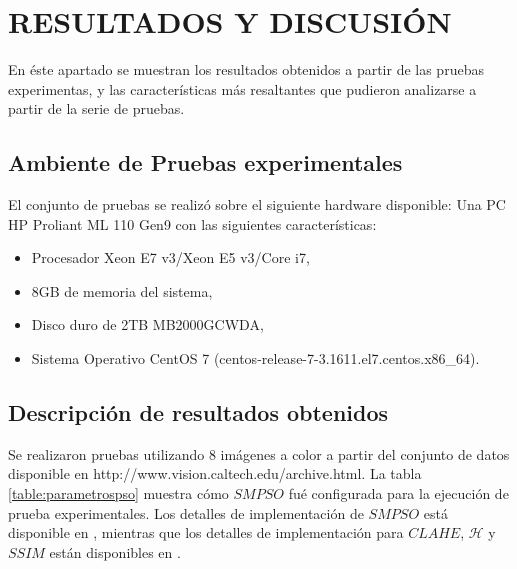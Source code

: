 \chapter{RESULTADOS Y DISCUSIÓN}
\label{sec:results_discussion}

En éste apartado se muestran los resultados obtenidos a partir de las pruebas experimentas, y las características más resaltantes que pudieron analizarse a partir de la serie de pruebas. 
\section{Ambiente de Pruebas experimentales}

El conjunto de pruebas se realizó sobre el siguiente hardware disponible: Una PC HP Proliant ML 110 Gen9 con las siguientes características:

\begin{itemize}
    \item Procesador Xeon E7 v3/Xeon E5 v3/Core i7,
    \item 8GB de memoria del sistema,
    \item Disco duro de 2TB MB2000GCWDA,
    \item Sistema Operativo CentOS 7 (centos-release-7-3.1611.el7.centos.x86\_64).
\end{itemize}


\section{Descripción de resultados obtenidos}

Se realizaron pruebas utilizando 8 imágenes a color a partir del conjunto de datos disponible en http://www.vision.caltech.edu/archive.html. La tabla \ref{table:parametrospso} muestra cómo $SMPSO$ fué configurada para la ejecución de prueba experimentales. Los detalles de implementación de $SMPSO$ está disponible en \cite{durillo2010jmetal}, mientras que los detalles de implementación para $CLAHE$, $\mathscr{H}$ y $SSIM$ están disponibles en \cite{bradski2000opencv}.

